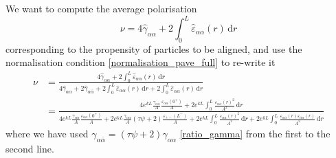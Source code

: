 \documentclass[pre,aps,superscriptaddress,nofootinbib]{revtex4}
\begin{document}
We want to compute the average polarisation
\begin{equation}
\nu = 4 \hat{\gamma}_{\alpha\alpha} + 2 \int_0^L \hat{\varepsilon}_{\alpha\alpha}(r) \, \mathrm{d}r
\label{nu_pave}
\end{equation}
corresponding to the propensity of particles to be aligned, and use the normalisation condition \eqref{normalisation_pave_full} to re-write it
\begin{equation}
\begin{aligned}
\nu &= \frac{4 \hat{\gamma}_{\alpha\alpha} + 2 \int_0^L \hat{\varepsilon}_{\alpha\alpha}(r) \, \mathrm{d}r}{4 \hat{\gamma}_{\alpha\alpha} + 2 \hat{\gamma}_{\alpha\overline{\alpha}} + 2 \int_0^L \hat{\varepsilon}_{\alpha\alpha}(r) \, \mathrm{d}r + 2 \int_0^L \hat{\varepsilon}_{\alpha\overline{\alpha}}(r) \, \mathrm{d}r}\\
&= \frac{4 e^{k L} \frac{\gamma_{\alpha\alpha}}{A} \frac{\varepsilon_{\alpha\alpha}(0^+)}{A} + 2 e^{k L} \int_0^L \frac{\varepsilon_{\alpha\alpha}(r)^2}{A^2} \, \mathrm{d}r}{4 e^{k L} \frac{\gamma_{\alpha\alpha}}{A} \frac{\varepsilon_{\alpha\alpha}(0^+)}{A} + 2 e^{k L} \frac{\gamma_{\alpha\alpha}}{A} (\tau \psi + 2) \frac{\varepsilon_{+-}(L^-)}{A} + 2 e^{k L} \int_0^L \frac{\varepsilon_{\alpha\alpha}(r)^2}{A^2} \, \mathrm{d}r + 2 e^{k L} \int_0^L \frac{\varepsilon_{\alpha\overline{\alpha}}(r)\varepsilon_{\overline{\alpha}\alpha}(r)}{A^2} \, \mathrm{d}r}
\end{aligned}
\label{nu_pave_full}
\end{equation}
where we have used $\gamma_{\alpha\overline{\alpha}} = (\tau \psi + 2) \gamma_{\alpha\alpha}$ \eqref{ratio_gamma} from the first to the second line.\\
\end{document}
